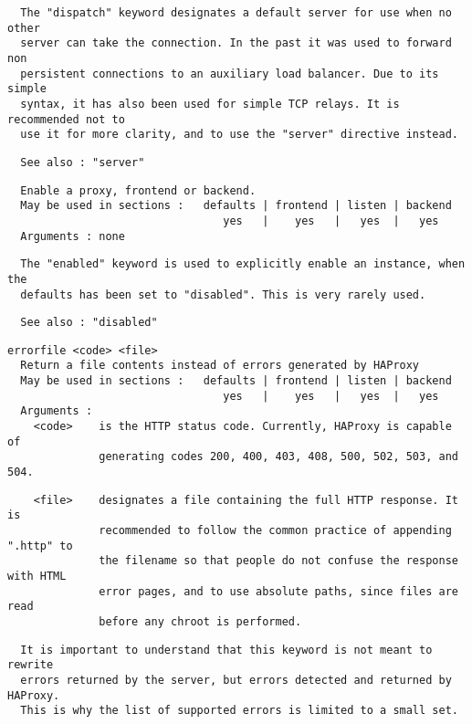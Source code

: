\begin{verbatim}
  The "dispatch" keyword designates a default server for use when no other
  server can take the connection. In the past it was used to forward non
  persistent connections to an auxiliary load balancer. Due to its simple
  syntax, it has also been used for simple TCP relays. It is recommended not to
  use it for more clarity, and to use the "server" directive instead.
\end{verbatim}

\begin{verbatim}
  See also : "server"
\end{verbatim}

\begin{verbatim}
  Enable a proxy, frontend or backend.
  May be used in sections :   defaults | frontend | listen | backend
                                 yes   |    yes   |   yes  |   yes
  Arguments : none
\end{verbatim}

\begin{verbatim}
  The "enabled" keyword is used to explicitly enable an instance, when the
  defaults has been set to "disabled". This is very rarely used.
\end{verbatim}

\begin{verbatim}
  See also : "disabled"
\end{verbatim}

\begin{verbatim}
errorfile <code> <file>
  Return a file contents instead of errors generated by HAProxy
  May be used in sections :   defaults | frontend | listen | backend
                                 yes   |    yes   |   yes  |   yes
  Arguments :
    <code>    is the HTTP status code. Currently, HAProxy is capable of
              generating codes 200, 400, 403, 408, 500, 502, 503, and 504.
\end{verbatim}

\begin{verbatim}
    <file>    designates a file containing the full HTTP response. It is
              recommended to follow the common practice of appending ".http" to
              the filename so that people do not confuse the response with HTML
              error pages, and to use absolute paths, since files are read
              before any chroot is performed.
\end{verbatim}

\begin{verbatim}
  It is important to understand that this keyword is not meant to rewrite
  errors returned by the server, but errors detected and returned by HAProxy.
  This is why the list of supported errors is limited to a small set.
\end{verbatim}

